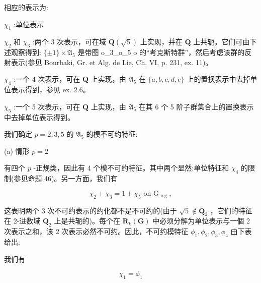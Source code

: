 \documentclass[10pt]{article}
\begin{document}
相应的表示为:

\({\chi }_{1}\) :单位表示

\({\chi }_{2}\) 和 \({\chi }_{3}\) :两个 3 次表示，可在域 \(\mathbf{Q}\left( \sqrt{5}\right)\) 上实现，并在 \(\mathbf{Q}\) 上共轭。它们可由下述观察得到: \(\{  \pm  1\}  \times  {\mathfrak{A}}_{5}\) 是带图 o\_3\_o\_5 o 的“考克斯特群”，然后考虑该群的反射表示(参见 Bourbaki, Gr. et Alg. de Lie, Ch. VI, p. 231, ex. 11)。

\({\chi }_{4}\) :一个 4 次表示，可在 \(\mathbf{Q}\) 上实现，由 \({\mathfrak{A}}_{5}\) 在 \(\{ a,b,c,d,e\}\) 上的置换表示中去掉单位表示得到，参见 ex. 2.6。

\({\chi }_{5}\) :一个 5 次表示，可在 \(\mathbf{Q}\) 上实现，由 \({\mathfrak{A}}_{5}\) 在其 6 个 5 阶子群集合上的置换表示中去掉单位表示得到。

我们确定 \(p = 2,3,5\) 的 \({\mathfrak{A}}_{5}\) 的模不可约特征:

(a) 情形 \(p = 2\)

有四个 \(p\) -正规类，因此有 4 个模不可约特征。其中两个显然:单位特征和 \({\chi }_{4}\) 的限制(参见命题 46)。另一方面，我们有

\[
{\chi }_{2} + {\chi }_{3} = 1 + {\chi }_{5}\text{ on }{\mathrm{G}}_{\text{ reg }},
\]

这表明两个 3 次不可约表示的约化都不是不可约的(由于 \(\sqrt{5} \notin  {\mathbf{Q}}_{2}\) ，它们的特征在 2-进数域 \({\mathbf{Q}}_{2}\) 上是共轭的)。每个在 \({\mathbf{R}}_{k}\left( \mathbf{G}\right)\) 中必须分解为单位表示与一個 2 次表示之和，该 2 次表示必然不可约。因此，不可约模特征 \({\phi }_{1},{\phi }_{2},{\phi }_{3},{\phi }_{4}\) 由下表给出:

\begin{center}
\end{center}

我们有

\[
{\chi }_{1} = {\phi }_{1}
\]
\end{document}
